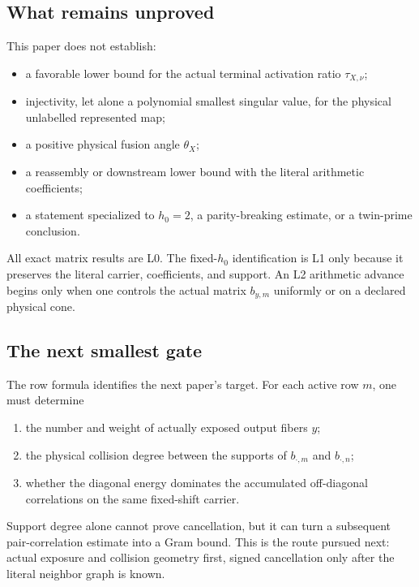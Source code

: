 \subsection{What remains unproved}
This paper does not establish:
\begin{itemize}
\item a favorable lower bound for the actual terminal activation ratio
\(\tau_{X,\nu}\);
\item injectivity, let alone a polynomial smallest singular value, for the
physical unlabelled represented map;
\item a positive physical fusion angle \(\theta_X\);
\item a reassembly or downstream lower bound with the literal arithmetic
coefficients;
\item a statement specialized to \(h_0=2\), a parity-breaking estimate, or a
twin-prime conclusion.
\end{itemize}

All exact matrix results are L0. The fixed-\(h_0\) identification is L1 only
because it preserves the literal carrier, coefficients, and support. An L2
arithmetic advance begins only when one controls the actual matrix
\(b_{y,m}\) uniformly or on a declared physical cone.

\subsection{The next smallest gate}
The row formula identifies the next paper's target. For each active row \(m\),
one must determine
\begin{enumerate}[label=(\roman*)]
\item the number and weight of actually exposed output fibers \(y\);
\item the physical collision degree between the supports of
\(b_{\cdot,m}\) and \(b_{\cdot,n}\);
\item whether the diagonal energy dominates the accumulated off-diagonal
correlations on the same fixed-shift carrier.
\end{enumerate}
Support degree alone cannot prove cancellation, but it can turn a subsequent
pair-correlation estimate into a Gram bound. This is the route pursued next:
actual exposure and collision geometry first, signed cancellation only after
the literal neighbor graph is known.
